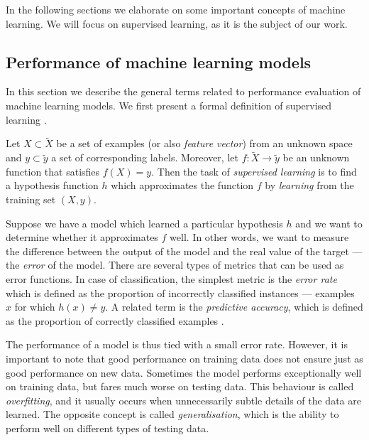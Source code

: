 In the following sections we elaborate on some important concepts of machine
learning. We will focus on supervised learning, as it is the subject of our work.

\subsection{Performance of machine learning models}
In this section we describe the general terms related to performance evaluation 
of machine learning models. We first present a formal 
definition of supervised learning \citep{Russell:2009:AIM:1671238,
Mitchell:1997:ML:541177}.

\begin{definition}
Let $X\subset\widetilde{X}$ be a set of examples (or also \emph{feature vector})
from an unknown space and $y\subset\widetilde{y}$ a set of corresponding labels.
Moreover, let $f: \widetilde{X} \rightarrow \widetilde{y}$ be an unknown function that
satisfies $f(X) = y$.
Then the task of \emph{supervised learning} is to find a hypothesis function
$h$ which approximates the function $f$ by \emph{learning} from the training
set $(X,y)$.

\end{definition}

Suppose we have a model which learned a particular hypothesis $h$ and we want
to determine whether it approximates $f$ well. In other words, we want to
measure the difference between the output of the model and the real value of
the target --- the \emph{error} of the model. There are several types of
metrics that can be used as error functions. In case of classification, the
simplest metric is the \emph{error rate} which is defined as the proportion of
incorrectly classified instances --- examples $x$ for which $h(x)\neq y$.
A related term is the \emph{predictive accuracy}, which is defined as the
proportion of correctly classified examples
\citep[p.~54]{Flach:2012:MLA:2490546}.

The performance of a model is thus tied with a small error rate. However, it is
important to note that good performance on training data does not ensure 
just as good performance on new data. Sometimes the model performs 
exceptionally well on training data, but fares much worse on testing data. 
This behaviour is called \emph{overfitting}, and it usually occurs when 
unnecessarily subtle details of the data are learned. The opposite concept 
is called \emph{generalisation}, which is the ability to perform well on 
different types of testing data.

